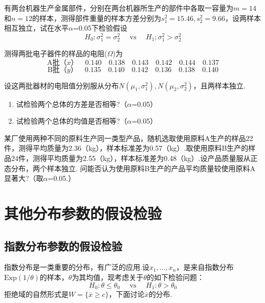 \begin{xiti}
	
	\item 有两台机器生产金属部件，分别在两台机器所生产的部件中各取一容量为$m=14$和$n=12$的样本，测得部件重量的样本方差分别为$s_{1}^{2}=15.46,s_{2}^{2}=9.66$，设两样本相互独立，试在水平$\alpha$=0.05下检验假设
	\[H _ { 0 } : \sigma _ { 1 } ^ { 2 } = \sigma _ { 2 } ^ { 2 } \quad \text { vs } \quad H _ { 1 } ; \sigma _ { 1 } ^ { 2 } > \sigma _ { 2 } ^ { 2 }\]
	
	
	\item 测得两批电子器件的样品的电阻($ \Omega$)为
	\[\text{A批（$x$）}\quad0.140 \quad 0.138 \quad 0.143 \quad 0.142 \quad 0.144 \quad 0.137\]
	\[\text{B批（$y$）}\quad0.135 \quad 0.140 \quad 0.142 \quad 0.136 \quad 0.138 \quad 0.140\]

	设这两批器材的电阻值分别服从分布$N \left( \mu _ { 1 } , \sigma _ { 1 } ^ { 2 } \right) , N \left( \mu _ { 2 } , \sigma _ { 2 } ^ { 2 } \right)$，且两样本独立.
	\begin{enumerate}
		\item 试检验两个总体的方差是否相等?（$\alpha$=0.05）
		\item 试检验两个总体的均值是否相等?（$\alpha$=0.05）
	\end{enumerate}
	
	\item 某厂使用两种不同的原料生产同一类型产品，随机选取使用原料A生产的样品22件，测得平均质量为2.36（kg），样本标准差为0.57（kg）.取使用原料B生产的样品24件，测得平均质量为2.55（kg），样本标准差为0.48（kg）.设产品质量服从正态分布，两个样本独立.
	问能否认为使用原料B生产的产品平均质量较使用原料A显著大?（取$\alpha$=0.05.）
\end{xiti}


\section{其他分布参数的假设检验\label{sec:7.3}}
\subsection{指数分布参数的假设检验\label{sec:7.3.1}}
指数分布是一类重要的分布，有广泛的应用.设$x_{1},\dotsc,x_{n}$，是来自指数分布$\mathrm{ Exp}(1/\theta)$的样本，$\theta$为其均值，现考虑关于$\theta$的如下检验问题：
\begin{equation}\label{eq7.3.1}
H _ { 0 } : \theta \leq \theta _ { 0 } \quad \text { vs } \quad H _ { 1 } : \theta > \theta _ { 0 }
\end{equation}
拒绝域的自然形式是$W = \{ \overline { x } \geq c \}$，下面讨论$\overline{ x }$的分布.


